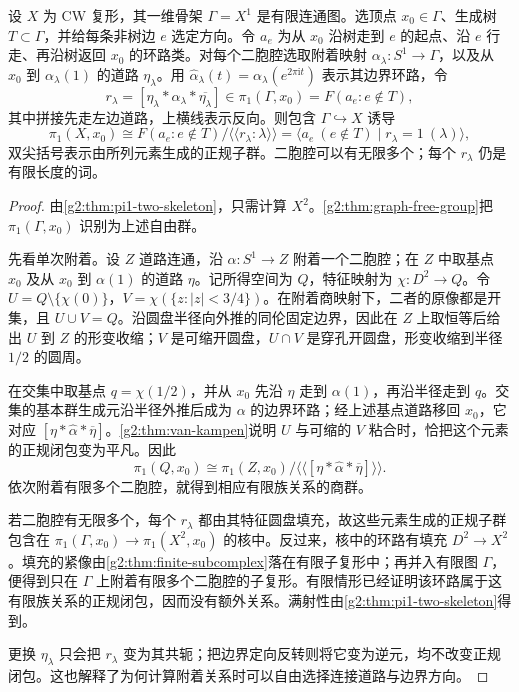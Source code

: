 \begin{proposition}\label{g2:prop:two-cell-presentation}
	设 \(X\) 为 CW 复形，其一维骨架 \(\Gamma=X^1\) 是有限连通图。选顶点 \(x_0\in\Gamma\)、生成树 \(T\subset\Gamma\)，并给每条非树边 \(e\) 选定方向。令 \(a_e\) 为从 \(x_0\) 沿树走到 \(e\) 的起点、沿 \(e\) 行走、再沿树返回 \(x_0\) 的环路类。对每个二胞腔选取附着映射 \(\alpha_\lambda:S^1\to\Gamma\)，以及从 \(x_0\) 到 \(\alpha_\lambda(1)\) 的道路 \(\eta_\lambda\)。用 \(\widehat\alpha_\lambda(t)=\alpha_\lambda(e^{2\pi\mathrm{i}t})\) 表示其边界环路，令
	\[
		r_\lambda=[\eta_\lambda*\widehat\alpha_\lambda*\overline{\eta_\lambda}]
		\in\pi_1(\Gamma,x_0)=F(a_e:e\notin T),
	\]
	其中拼接先走左边道路，上横线表示反向。则包含 \(\Gamma\hookrightarrow X\) 诱导
	\[
		\pi_1(X,x_0)\cong
		F(a_e:e\notin T)\big/\langle\!\langle r_\lambda:\lambda\rangle\!\rangle
		=\langle a_e\ (e\notin T)\mid r_\lambda=1\ (\lambda)\rangle,
	\]
	双尖括号表示由所列元素生成的正规子群。二胞腔可以有无限多个；每个 \(r_\lambda\) 仍是有限长度的词。
\end{proposition}
\begin{proof}
	由\cref{g2:thm:pi1-two-skeleton}，只需计算 \(X^2\)。\cref{g2:thm:graph-free-group}把 \(\pi_1(\Gamma,x_0)\) 识别为上述自由群。

	先看单次附着。设 \(Z\) 道路连通，沿 \(\alpha:S^1\to Z\) 附着一个二胞腔；在 \(Z\) 中取基点 \(x_0\) 及从 \(x_0\) 到 \(\alpha(1)\) 的道路 \(\eta\)。记所得空间为 \(Q\)，特征映射为 \(\chi:D^2\to Q\)。令 \(U=Q\setminus\{\chi(0)\}\)，\(V=\chi(\{z:|z|<3/4\})\)。在附着商映射下，二者的原像都是开集，且 \(U\cup V=Q\)。沿圆盘半径向外推的同伦固定边界，因此在 \(Z\) 上取恒等后给出 \(U\) 到 \(Z\) 的形变收缩；\(V\) 是可缩开圆盘，\(U\cap V\) 是穿孔开圆盘，形变收缩到半径 \(1/2\) 的圆周。

	在交集中取基点 \(q=\chi(1/2)\)，并从 \(x_0\) 先沿 \(\eta\) 走到 \(\alpha(1)\)，再沿半径走到 \(q\)。交集的基本群生成元沿半径外推后成为 \(\alpha\) 的边界环路；经上述基点道路移回 \(x_0\)，它对应 \([\eta*\widehat\alpha*\overline\eta]\)。\cref{g2:thm:van-kampen}说明 \(U\) 与可缩的 \(V\) 粘合时，恰把这个元素的正规闭包变为平凡。因此
	\[
		\pi_1(Q,x_0)\cong
		\pi_1(Z,x_0)\big/\langle\!\langle
		[\eta*\widehat\alpha*\overline\eta]\rangle\!\rangle.
	\]
	依次附着有限多个二胞腔，就得到相应有限族关系的商群。

	若二胞腔有无限多个，每个 \(r_\lambda\) 都由其特征圆盘填充，故这些元素生成的正规子群包含在 \(\pi_1(\Gamma,x_0)\to\pi_1(X^2,x_0)\) 的核中。反过来，核中的环路有填充 \(D^2\to X^2\)。填充的紧像由\cref{g2:thm:finite-subcomplex}落在有限子复形中；再并入有限图 \(\Gamma\)，便得到只在 \(\Gamma\) 上附着有限多个二胞腔的子复形。有限情形已经证明该环路属于这有限族关系的正规闭包，因而没有额外关系。满射性由\cref{g2:thm:pi1-two-skeleton}得到。

	更换 \(\eta_\lambda\) 只会把 \(r_\lambda\) 变为其共轭；把边界定向反转则将它变为逆元，均不改变正规闭包。这也解释了为何计算附着关系时可以自由选择连接道路与边界方向。
\end{proof}

